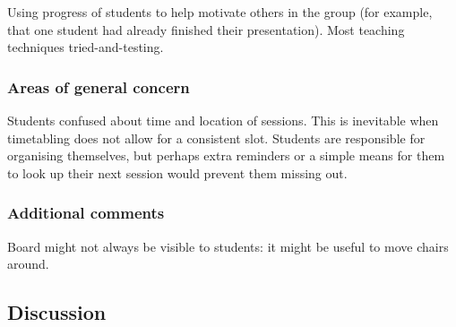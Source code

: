 Using progress of students to help motivate others in the group (for example, that one student had already finished their presentation). Most teaching techniques tried-and-testing.

\subsubsection{Areas of general concern}

Students confused about time and location of sessions. This is inevitable when timetabling does not allow for a consistent slot. Students are responsible for organising themselves, but perhaps extra reminders or a simple means for them to look up their next session would prevent them missing out.

\subsubsection{Additional comments}

Board might not always be visible to students: it might be useful to move chairs around.

\subsection{Discussion}\label{sec:other-discuss}
